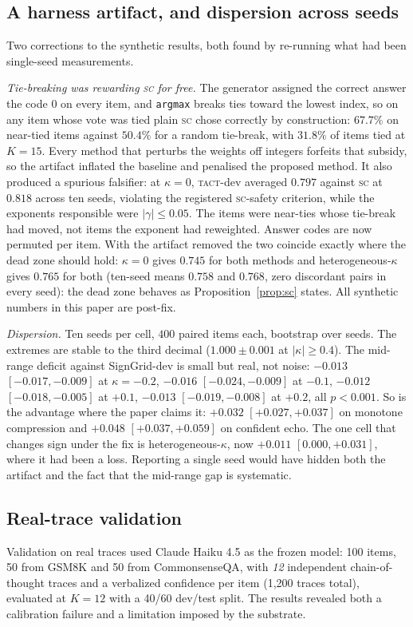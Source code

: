 \documentclass{article}
\newcommand{\SC}{\textsc{sc}}
\newcommand{\TACT}{\textsc{tact}}
\begin{document}
\subsection{A harness artifact, and dispersion across seeds}\label{sec:seeds}
Two corrections to the synthetic results, both found by re-running what had
been single-seed measurements.

\emph{Tie-breaking was rewarding \SC{} for free.} The generator assigned the
correct answer the code $0$ on every item, and \texttt{argmax} breaks ties
toward the lowest index, so on any item whose vote was tied plain \SC{} chose
correctly by construction: $67.7\%$ on near-tied items against $50.4\%$ for a
random tie-break, with $31.8\%$ of items tied at $K{=}15$. Every method that
perturbs the weights off integers forfeits that subsidy, so the artifact
inflated the baseline and penalised the proposed method. It also produced a
spurious falsifier: at $\kappa=0$, \TACT-dev averaged $0.797$ against \SC{} at
$0.818$ across ten seeds, violating the registered \SC{}-safety criterion, while the exponents responsible were
$|\gamma|\le0.05$. The items were near-ties whose tie-break had moved, not
items the exponent had reweighted. Answer codes are now permuted per item.
With the artifact removed the two coincide exactly where the dead zone
should hold: $\kappa=0$ gives $0.745$ for both methods and
heterogeneous-$\kappa$ gives $0.765$ for both (ten-seed means $0.758$ and
$0.768$, zero discordant pairs in every seed): the dead zone behaves as
Proposition~\ref{prop:sc} states. All synthetic numbers in this paper are
post-fix.

\emph{Dispersion.} Ten seeds per cell, $400$ paired items each, bootstrap over
seeds. The extremes are stable to the third decimal ($1.000\pm0.001$ at
$|\kappa|\ge0.4$). The mid-range deficit against SignGrid-dev is small but
real, not noise: $-0.013$ $[-0.017,-0.009]$ at $\kappa=-0.2$, $-0.016$
$[-0.024,-0.009]$ at $-0.1$, $-0.012$ $[-0.018,-0.005]$ at $+0.1$, $-0.013$
$[-0.019,-0.008]$ at $+0.2$, all $p<0.001$. So is the advantage where the
paper claims it: $+0.032$ $[+0.027,+0.037]$ on monotone compression and
$+0.048$ $[+0.037,+0.059]$ on confident echo. The one cell that changes sign
under the fix is heterogeneous-$\kappa$, now $+0.011$ $[0.000,+0.031]$, where it had
been a loss. Reporting a single seed would have hidden both the artifact and
the fact that the mid-range gap is systematic.


\subsection{Real-trace validation}\label{sec:real}
Validation on real traces used Claude Haiku 4.5 as the frozen model: 100 items, 50 from
GSM8K \citep{gsm8k2021} and 50 from CommonsenseQA, with \emph{12} independent
chain-of-thought traces and a verbalized confidence per item (1{,}200 traces
total), evaluated at $K{=}12$ with a 40/60 dev/test split. The results revealed
both a calibration failure and a limitation imposed by the substrate.
\end{document}

